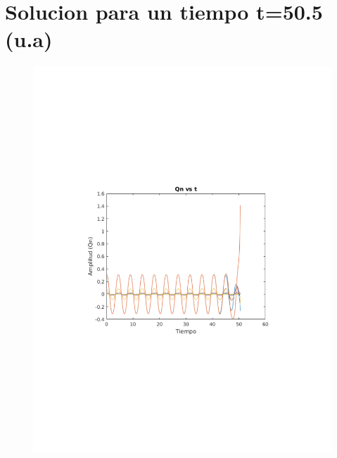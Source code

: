 \documentclass[10pt,a4paper]{article}
\author{M.Sabogal}
\begin{document}
\section{Solucion para un tiempo t=50.5 (u.a)}
\begin{figure}[h!]
\centering 
\includegraphics[scale=0.8]{Qn2-505.pdf}
\end{figure}
\end{document}
